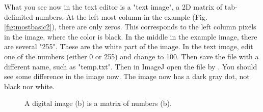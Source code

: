 \begin{indentexercise}{1}
What you see now in the text editor is a "text image", a 2D
matrix of tab-delimited numbers. At the left most column in the example
(Fig. \ref{fig:mostbasic2}), there are only zeros. This corresponds to the left column
pixels in the image, where the color is black. In the middle in the
example image, there are several "255".
These are the white part of the image.
In the text image, edit one of the numbers (either 0 or 255) and change
to 100. Then save the file with a different name, such as
"temp.txt". Then in ImageJ open the file by . You should see some difference in the image now. 
The image now has a dark gray dot, not black nor white.
\end{indentexercise}

\begin{figure}[htbp]
\centering
{}
\caption{ A digital image (b) is a matrix of numbers (b).}
\label{fig:mostbasic}
\end{figure} 

